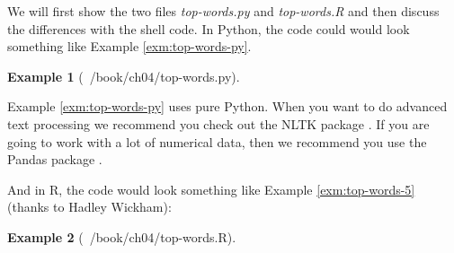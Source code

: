 \documentclass[
]{book}
\newenvironment{Shaded}{\begin{snugshade}}{\end{snugshade}}
\newcommand{\BuiltInTok}[1]{#1}
\newcommand{\CommentTok}[1]{\textcolor[rgb]{0.56,0.35,0.01}{\textit{#1}}}
\newcommand{\ControlFlowTok}[1]{\textcolor[rgb]{0.13,0.29,0.53}{\textbf{#1}}}
\newcommand{\DecValTok}[1]{\textcolor[rgb]{0.00,0.00,0.81}{#1}}
\newcommand{\ImportTok}[1]{#1}
\newcommand{\KeywordTok}[1]{\textcolor[rgb]{0.13,0.29,0.53}{\textbf{#1}}}
\newcommand{\NormalTok}[1]{#1}
\newcommand{\OperatorTok}[1]{\textcolor[rgb]{0.81,0.36,0.00}{\textbf{#1}}}
\newcommand{\SpecialCharTok}[1]{\textcolor[rgb]{0.00,0.00,0.00}{#1}}
\newcommand{\StringTok}[1]{\textcolor[rgb]{0.31,0.60,0.02}{#1}}
\theoremstyle{definition}
\theoremstyle{definition}
\newtheorem{example}{Example}[chapter]
\theoremstyle{definition}
\theoremstyle{remark}
\begin{document}
We will first show the two files \emph{top-words.py} and \emph{top-words.R} and then discuss the differences with the shell code. In Python, the code could would look something like Example \ref{exm:top-words-py}.

\begin{example}[~/book/ch04/top-words.py]
\protect\hypertarget{exm:top-words-py}{}{\label{exm:top-words-py} {} }
\end{example}

\begin{Shaded}
\end{Shaded}

\begin{rmdnote}
Example
\ref{exm:top-words-py}
uses pure Python. When you want to do advanced text processing we recommend you check out the NLTK package \citep{Perkins2010}. If you are going to work with a lot of numerical data, then we recommend you use the Pandas package \citep{McKinney2012}.
\end{rmdnote}

And in R, the code would look something like Example \ref{exm:top-words-5} (thanks to Hadley Wickham):

\begin{example}[~/book/ch04/top-words.R]
\protect\hypertarget{exm:top-words-5}{}{\label{exm:top-words-5} {} }
\end{example}
\end{document}
